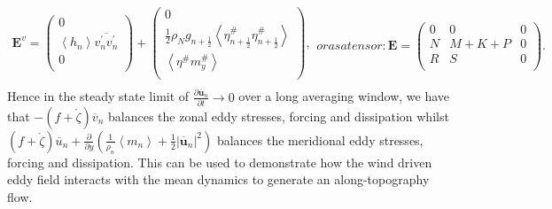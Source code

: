 \documentclass[12pt,a4paper]{report}
\newcommand*\thkmean[1]{\overline{#1}}
\newcommand*\thkres[1]{{#1}^{\prime}}
\newcommand*\nthkmean[1]{\left\langle{#1}\right\rangle}
\newcommand*\nthkres[1]{{#1}^{\#}}
\newcommand*\spec[1]{\mathring{#1}}
\newcommand*{\half}{\frac{1}{2}}
\newcommand*{\partialdiff}[2][{}]{\frac{\partial #1}{\partial #2}}
\begin{document}
\begin{subequations}
\begin{equation}
\begin{array}{c}
	\boldsymbol{E}^{v}=\left(
	\begin{array}{c}
	0 \\
	\nthkmean{h_{n}}\thkmean{\thkres{v}_{n}\thkres{v}_{n}} \\
	0 \\
	\end{array}\right)+\left(
	\begin{array}{c}
	0\\
	\half\rho_{N}g_{n+\half} \nthkmean{\nthkres{\eta}_{n+\half}\nthkres{\eta}_{n+\half}} \\
	\nthkmean{\nthkres{\eta}\nthkres{m}_{y}} \\
	\end{array}\right), \\
	\end{array}
	\end{equation}
	or as a tensor:
	\begin{equation}
	\boldsymbol{E}=\left(\begin{array}{ccc}
	0 & 0 & 0 \\
	N & M + K + P& 0 \\
	R & S & 0 \\
	\end{array}\right).
	\end{equation}
\end{subequations}
Hence in the steady state limit of $\partialdiff[\thkmean{\boldsymbol{u}}_{n}]{t} \xrightarrow{} 0$ over a long averaging window, we have that $-(f+\spec{\zeta})\thkmean{v}_{n}$
balances the zonal eddy stresses, forcing and dissipation whilst 
 $(f+\spec{\zeta})\thkmean{u}_{n} +  \frac{\partial }{\partial y}\left(\frac{1}{\rho_{n}}\nthkmean{m_{n}}+\half \left|\thkmean{\boldsymbol{u}}_{n}\right|^{2}\right)$ balances the meridional 
 eddy stresses, forcing and dissipation. This can be used to demonstrate how the 
 wind driven eddy field interacts with the mean dynamics to generate an along-topography
 flow. 
 
\end{document}
